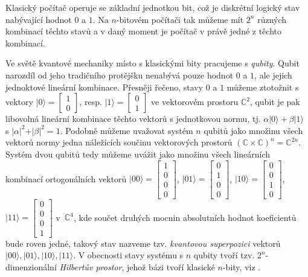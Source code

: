 \documentclass[12pt]{report}
\begin{document}
Klasický počítač operuje se základní jednotkou bit, což je diskrétní logický stav nabývající hodnot $0$ a $1$. Na $n$-bitovém počítači tak můžeme mít $2^n$ různých kombinací těchto stavů a v daný moment je počítač v právě jedné z těchto kombinací.

Ve světě kvantové mechaniky místo s klasickými bity pracujeme s \textit{qubity}. Qubit narozdíl od jeho tradičního protějšku nenabývá pouze hodnot $0$ a $1$, ale jejich jednoktové lineární kombinace. Přesněji řečeno, stavy $0$ a $1$ můžeme ztotožnit s vektory $\vert 0 \rangle = \begin{bmatrix}
1\\
0
\end{bmatrix}$, resp. $\vert 1 \rangle = \begin{bmatrix}
0\\
1
\end{bmatrix}$ ve vektorovém prostoru $\mathbb{C}^2$, qubit je pak libovolná lineární kombinace těchto vektorů s jednotkovou normu, tj. $\alpha \vert 0 \rangle + \beta \vert 1 \rangle$ s $\vert \alpha \vert ^2 + \vert \beta \vert ^2 =1$. Podobně můžeme uvažovat systém $n$ qubitů jako množinu všech vektorů normy jedna náležících součinu vektorových prostorů $(\mathbb{C} \times \mathbb{C})^n = \mathbb{C}^{2n}$. Systém dvou qubitů tedy můžeme uvážit jako množinu všech lineárních kombinací ortogonálních vektorů $\vert 00 \rangle = \begin{bmatrix}
1\\
0\\
0\\
0
\end{bmatrix}$, $\vert 01 \rangle = \begin{bmatrix}
0\\
1\\
0\\
0
\end{bmatrix}$, $\vert 10 \rangle = \begin{bmatrix}
0\\
0\\
1\\
0
\end{bmatrix}$, $\vert 11 \rangle = \begin{bmatrix}
0\\
0\\
0\\
1
\end{bmatrix}$ v~$\mathbb{C}^4$, kde součet druhých mocnin absolutních hodnot koeficientů bude roven jedné, takový stav nazveme tzv. \textit{kvantovou superpozici} vektorů $\vert 00 \rangle, \vert 01 \rangle, \vert 10 \rangle, \vert 11 \rangle$. V obecnosti stavy systému s $n$ qubity tvoří tzv. $2^n$-dimenzionální \textit{Hilbertův prostor}, jehož bázi tvoří klasické $n$-bity, viz \cite{Griffiths}.
\end{document}
